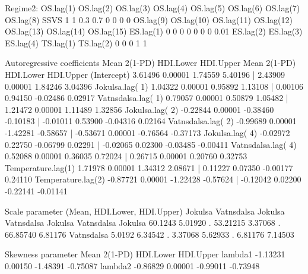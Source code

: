 \begin{example}
Regime2:
     OS.lag(1)  OS.lag(2)  OS.lag(3)  OS.lag(4)  OS.lag(5)  OS.lag(6)  OS.lag(7) OS.lag(8) 
SSVS        1          1        0.3        0.7          0          0          0         0  
     OS.lag(9) OS.lag(10) OS.lag(11) OS.lag(12) OS.lag(13) OS.lag(14) OS.lag(15) ES.lag(1) 
            0          0          0          0          0          0          0      0.01  
     ES.lag(2)  ES.lag(3)  ES.lag(4)  TS.lag(1)  TS.lag(2)
            0          0          0          1          1

Autoregressive coefficients
                      Mean  2(1-PD) HDI.Lower HDI.Upper    Mean  2(1-PD) HDI.Lower HDI.Upper
(Intercept)         3.61496 0.00001  1.74559  5.40196 |  2.43909 0.00001  1.84246  3.04396
Jokulsa.lag( 1)     1.04322 0.00001  0.95892  1.13108 |  0.00106 0.94150 -0.02486  0.02917
Vatnsdalsa.lag( 1)  0.79057 0.00001  0.50879  1.05482 |  1.21472 0.00001  1.11489  1.32856
Jokulsa.lag( 2)    -0.22844 0.00001 -0.38460 -0.10183 | -0.01011 0.53900 -0.04316  0.02164
Vatnsdalsa.lag( 2) -0.99689 0.00001 -1.42281 -0.58657 | -0.53671 0.00001 -0.76564 -0.37173
Jokulsa.lag( 4)    -0.02972 0.22750 -0.06799  0.02291 | -0.02065 0.02300 -0.03485 -0.00411
Vatnsdalsa.lag( 4)  0.52088 0.00001  0.36035  0.72024 |  0.26715 0.00001  0.20760  0.32753
Temperature.lag(1)  1.71978 0.00001  1.34312  2.08671 |  0.11227 0.07350 -0.00177  0.24110
Temperature.lag(2) -0.87721 0.00001 -1.22428 -0.57624 | -0.12042 0.02200 -0.22141 -0.01141

Scale parameter (Mean, HDI.Lower, HDI.Upper)
           Jokulsa Vatnsdalsa       Jokulsa Vatnsdalsa       Jokulsa Vatnsdalsa
Jokulsa    60.1243    5.01920    . 53.21215    3.37068    . 66.85740    6.81176
Vatnsdalsa  5.0192    6.34542    .  3.37068    5.62933    .  6.81176    7.14503

Skewness parameter
                        Mean    2(1-PD)  HDI.Lower HDI.Upper
lambda1              -1.13231   0.00150  -1.48391  -0.75087
lambda2              -0.86829   0.00001  -0.99011  -0.73948
\end{example}

